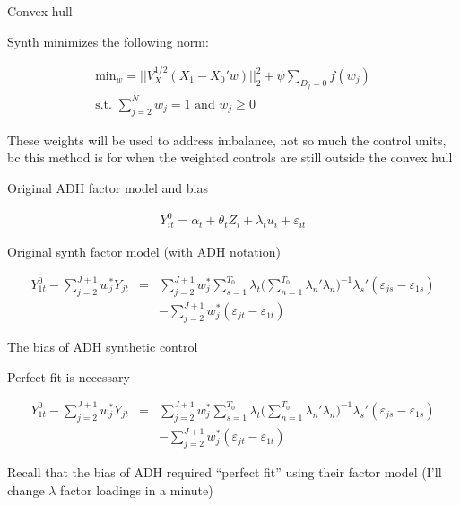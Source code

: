 \documentclass{beamer}
\begin{document}
\begin{frame}{Convex hull}

Synth minimizes the following norm:

\begin{eqnarray*}
\textrm{min}_w = || V_X^{1/2} (X_1 - X_0'w) ||_2^2 + \psi \sum_{D_j=0}f(w_j)\\
\textrm{s.t. }\sum_{j=2}^N w_{j} =1 \textrm{ and } w_j \geq 0
\end{eqnarray*}

These weights will be used to address imbalance, not so much the control units, bc this method is for when the weighted controls are still outside the convex hull

\end{frame}




\begin{frame}{Original ADH factor model and bias}

\begin{eqnarray*}
Y_{it}^0 = \alpha_t + \theta_t Z_i + \lambda_t u_i + \varepsilon_{it}
\end{eqnarray*}

\bigskip

Original synth factor model (with ADH notation)

\bigskip

\begin{eqnarray*}
Y^0_{1t} - \sum^{J+1}_{j=2}w^*_jY_{jt} &=& \sum_{j=2}^{J+1} w_j^* \sum_{s=1}^{T_0} \lambda_t \bigg ( \sum_{n=1}^{T_0} \lambda_n'\lambda_n \bigg )
^{-1} \lambda_s'(\varepsilon_{js} - \varepsilon_{1s} ) \\
&& - \sum_{j=2}^{J+1} w_j^* (\varepsilon_{jt} - \varepsilon_{1t})
\end{eqnarray*}

\bigskip

The bias of ADH synthetic control


\end{frame}




\begin{frame}{Perfect fit is necessary}

\begin{eqnarray*}
Y^0_{1t} - \sum^{J+1}_{j=2}w^*_jY_{jt} &=& \sum_{j=2}^{J+1} w_j^* \sum_{s=1}^{T_0} \lambda_t \bigg ( \sum_{n=1}^{T_0} \lambda_n'\lambda_n \bigg )
^{-1} \lambda_s'(\varepsilon_{js} - \varepsilon_{1s} ) \\
&& - \sum_{j=2}^{J+1} w_j^* (\varepsilon_{jt} - \varepsilon_{1t})
\end{eqnarray*}

\bigskip

Recall that the bias of ADH required ``perfect fit'' using their factor model (I'll change $\lambda$ factor loadings in a minute)

\end{frame}
\end{document}
